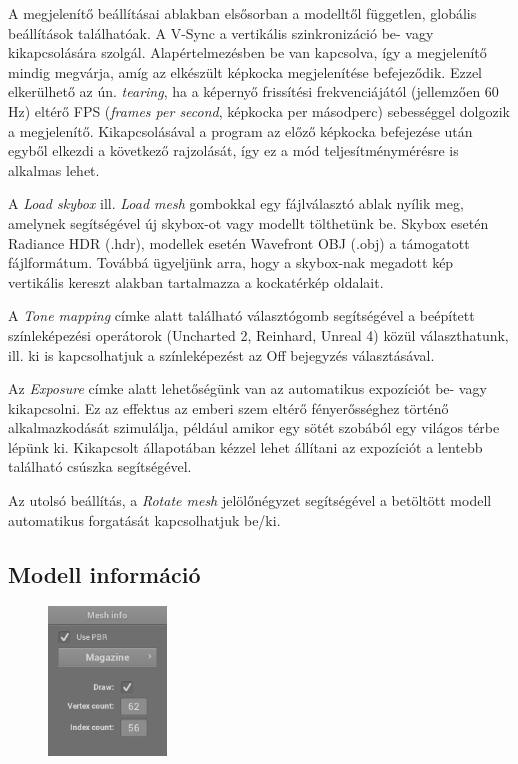 A megjelenítő beállításai ablakban elsősorban a modelltől független, globális beállítások találhatóak. A V-Sync a vertikális szinkronizáció be- vagy kikapcsolására szolgál. Alapértelmezésben be van kapcsolva, így a megjelenítő mindig megvárja, amíg az elkészült képkocka megjelenítése befejeződik. Ezzel elkerülhető az ún. \textit{tearing}, ha a képernyő frissítési frekvenciájától (jellemzően 60 Hz) eltérő FPS (\textit{frames per second}, képkocka per másodperc) sebességgel dolgozik a megjelenítő. Kikapcsolásával a program az előző képkocka befejezése után egyből elkezdi a következő rajzolását, így ez a mód teljesítménymérésre is alkalmas lehet.

A \textit{Load skybox} ill. \textit{Load mesh} gombokkal egy fájlválasztó ablak nyílik meg, amelynek segítségével új skybox-ot vagy modellt tölthetünk be. Skybox esetén Radiance HDR (.hdr), modellek esetén Wavefront OBJ (.obj) a támogatott fájlformátum. Továbbá ügyeljünk arra, hogy a skybox-nak megadott kép vertikális kereszt alakban tartalmazza a kockatérkép oldalait.

A \textit{Tone mapping} címke alatt található választógomb segítségével a beépített színleképezési operátorok (Uncharted 2, Reinhard, Unreal 4) közül választhatunk, ill. ki is kapcsolhatjuk a színleképezést az Off bejegyzés választásával.

Az \textit{Exposure} címke alatt lehetőségünk van az automatikus expozíciót be- vagy kikapcsolni. Ez az effektus az emberi szem eltérő fényerősséghez történő alkalmazkodását szimulálja, például amikor egy sötét szobából egy világos térbe lépünk ki. Kikapcsolt állapotában kézzel lehet állítani az expozíciót a lentebb található csúszka segítségével.

Az utolsó beállítás, a \textit{Rotate mesh} jelölőnégyzet segítségével a betöltött modell automatikus forgatását kapcsolhatjuk be/ki.

\clearpage

\subsection{Modell információ}

\begin{figure}
    \vspace{-23pt}
    \includegraphics[width=0.28\textwidth]{images/mesh_info.png}
    \vspace{-20pt}
\end{figure}

